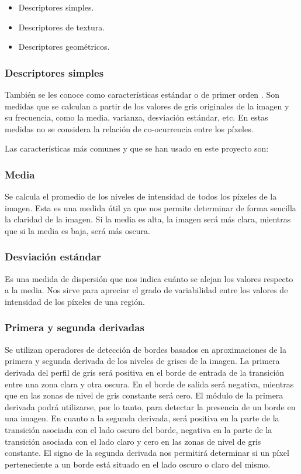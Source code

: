 \begin{itemize}
\item Descriptores simples.
\item Descriptores de textura.
\item Descriptores geométricos.
\end{itemize}

\subsubsection{Descriptores simples}
También se les conoce como características estándar o de primer orden \cite{presutti2004matriz}. Son medidas que se calculan a partir de los valores de gris originales de la imagen y su frecuencia, como la media, varianza, desviación estándar, etc. En estas medidas no se considera la relación de co-ocurrencia entre los píxeles.

Las características más comunes y que se han usado en este proyecto son:

\subsubsection*{Media}
Se calcula el promedio de los niveles de intensidad de todos los píxeles de la imagen. Esta es una medida útil ya que nos permite determinar de forma sencilla la claridad de la imagen. Si la media es alta, la imagen será más clara, mientras que si la media es baja, será más oscura.

\subsubsection*{Desviación estándar}
Es una medida de dispersión que nos indica cuánto se alejan los valores respecto a la media. Nos sirve para apreciar el grado de variabilidad entre los valores de intensidad de los píxeles de una región.

\subsubsection*{Primera y segunda derivadas}
Se utilizan operadores de detección de bordes \cite{marcosmartin2004} basados en aproximaciones de la primera y segunda derivada de los niveles de grises de la imagen. La primera derivada del perfil de gris será positiva en el borde de entrada de la transición entre una zona clara y otra oscura. En el borde de salida será negativa, mientras que en las zonas de nivel de gris constante será cero. El módulo de la primera derivada podrá utilizarse, por lo tanto, para detectar la presencia de un borde en una imagen. En cuanto a la segunda derivada, será positiva en la parte de la transición asociada con el lado oscuro del borde, negativa en la parte de la transición asociada con el lado claro y cero en las zonas de nivel de gris constante. El signo de la segunda derivada nos permitirá determinar si un píxel perteneciente a un borde está situado en el lado oscuro o claro del mismo.


